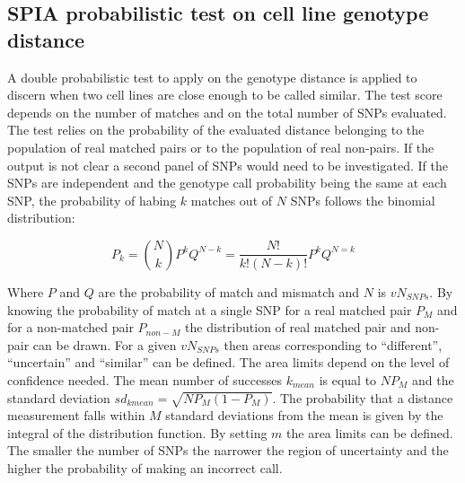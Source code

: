 	\subsection{SPIA probabilistic test on cell line genotype distance}
	A double probabilistic test to apply on the genotype distance is applied to discern when two cell lines are close enough to be called similar.
	The test score depends on the number of matches and on the total number of SNPs evaluated.
	The test relies on the probability of the evaluated distance belonging to the population of real matched pairs or to the population of real non-pairs.
	If the output is not clear a second panel of SNPs would need to be investigated.
	If the SNPs are independent and the genotype call probability being the same at each SNP, the probability of habing $k$ matches out of $N$ SNPs follows the binomial distribution:

	$$P_k = \binom{N}{k} P^kQ^{N-k} = \frac{N!}{k!(N-k)!}P^kQ^{N=k}$$

	Where $P$ and $Q$ are the probability of match and mismatch and $N$ is $vN_{SNPs}$.
	By knowing the probability of match at a single SNP for a real matched pair $P_M$ and for a non-matched pair $P_{non-M}$ the distribution of real matched pair and non-pair can be drawn.
	For a given $vN_{SNPs}$ then areas corresponding to ``different'', ``uncertain'' and ``similar'' can be defined.
	The area limits depend on the level of confidence needed.
	The mean number of successes $k_{mean}$ is equal to $NP_M$ and the standard deviation $sd_{kmean} = \sqrt{NP_M(1-P_M)}$.
	The probability that a distance measurement falls within $M$ standard deviations from the mean is given by the integral of the distribution function.
	By setting $m$ the area limits can be defined.
	The smaller the number of SNPs the narrower the region of uncertainty and the higher the probability of making an incorrect call.
